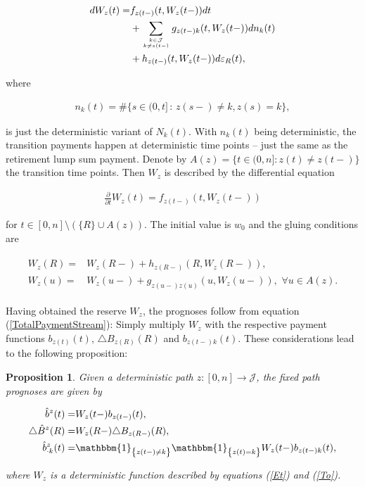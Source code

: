 \documentclass{article}
\newcommand{\1}[1]{\mathbbm{1}_{\left\lbrace #1 \right\rbrace}}
\theoremstyle{break}
\newtheorem{proposition}[definition]{Proposition}%
\theoremstyle{remark}
\numberwithin{equation}{section}
\begin{document}
\begin{align*}
	\begin{split}
		dW_z(t) =& f_{z(t-)}(t,W_z(t-)) dt \\
		&+ \sum_{k \in \mathcal{J} \atop k \neq z(t-)} g_{z(t-)k}(t,W_z(t-)) dn_{k}(t) \\
		&+ h_{z(t-)}(t,W_z(t-)) d \varepsilon_R(t),
	\end{split}
\end{align*}

where

\begin{align*}
	n_{k}(t) = \# \{ s \in (0,t] \, : \, z(s-) \neq k, z(s)=k \},
\end{align*}

is just the deterministic variant of $N_k(t)$. With $n_k(t)$ being deterministic, the transition payments happen at deterministic time points -- just the same as the retirement lump sum payment. Denote by $A(z) = \{ t \in (0,n] : z(t) \neq z(t-) \}$ the transition time points. Then $W_z$ is described by the differential equation

\begin{align} \label{Et}
	\frac{\partial}{\partial t} W_z(t) = f_{z(t-)}(t,W_z(t-))
\end{align}

for $t \in [0,n] \setminus \left( \{ R \} \cup A(z) \right)$. The initial value is $w_0$ and the gluing conditions are

\begin{align} \label{To}
\begin{split}
	W_z(R) =& W_z(R-) + h_{z(R-)}(R,W_z(R-)), \\
	W_z(u) =& W_z(u-) + g_{z(u-)z(u)}(u,W_z(u-)), \, \, \forall u \in A(z).
\end{split}
\end{align}

Having obtained the reserve $W_z$, the prognoses follow from equation (\ref{TotalPaymentStream}): Simply multiply $W_z$ with the respective payment functions $b_{z(t)}(t)$, $\triangle B_{z(R)}(R)$ and $b_{z(t-)k}(t)$. These considerations lead to the following proposition:

\begin{proposition} \label{FixedPath}
	Given a deterministic path $z: [0,n] \to \mathcal{J}$, the fixed path prognoses are given by
	
	\begin{align*}
		\hat{b}^{z}(t) =& W_z(t-)b_{z(t-)}(t) , \\
		\triangle \hat{B}^{z}(R) =& W_z(R-)\triangle B_{z(R-)}(R) , \\
		\hat{b}_{\cdot k}^{z}(t) =& \1{z(t-) \neq k} \1{z(t) = k} W_z(t-) b_{z(t-) k}(t) ,
	\end{align*}

where $W_z$ is a deterministic function described by equations (\ref{Et}) and (\ref{To}).
\end{proposition}
\end{document}
